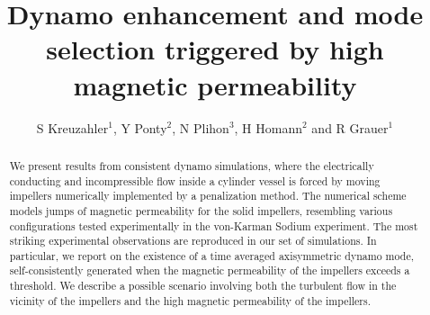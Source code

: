 \documentclass[aps,prl,twocolumn,showpacs,amsmath,amssymb]{revtex4-1}%
\begin{document}
\title{Dynamo enhancement and mode selection triggered by high magnetic permeability}

\author{S Kreuzahler$^1$, Y Ponty$^2$, N Plihon$^3$, H Homann$^2$ and R Grauer$^1$}
\address{$^1$ Institut f\"ur Theoretische Physik I, Ruhr-Universit\"at Bochum, 44780 Bochum, Germany}
\address{$^2$ Universit\'e de la C\^ote d'Azur, CNRS, Observatoire de la C\^ote d'Azur, 
B. P. 4229 06304 Nice Cedex 4 , France}
\address{$^3$ Univ Lyon, ENS de Lyon, Univ Claude Bernard Lyon 1, CNRS,
Laboratoire de Physique, F-69342 Lyon, France}


\begin{abstract}
 We present results from consistent dynamo simulations, where the
 electrically conducting and incompressible flow inside a cylinder
 vessel is forced by moving impellers numerically implemented
 by a penalization method. The numerical scheme models jumps of
 magnetic permeability for the solid impellers, resembling
 various configurations tested experimentally in the von-Karman Sodium
 experiment. The most striking experimental observations are reproduced in
 our set of simulations. In particular, we report on the existence of a time averaged
 axisymmetric dynamo mode, self-consistently generated when the
 magnetic permeability of the impellers exceeds a threshold.  We
 describe a possible scenario involving both the turbulent flow in
 the vicinity of the impellers and the high magnetic permeability of
 the impellers.
\end{abstract}






\maketitle
\end{document}
